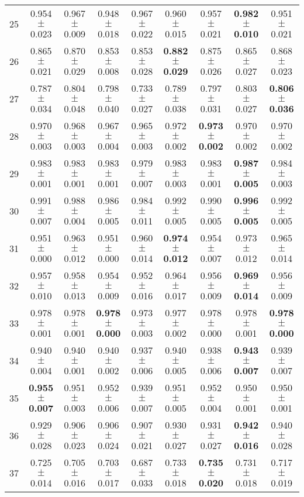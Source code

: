 \begin{table}[!ht]
{\begin{tabular}{r c c c c c c c c}
25 & 0.954 $\pm$ 0.023 & 0.967 $\pm$ 0.009 & 0.948 $\pm$ 0.018 & 0.967 $\pm$ 0.022 & 0.960 $\pm$ 0.015 & 0.957 $\pm$ 0.021 & \textbf{0.982 $\pm$ 0.010} & 0.951 $\pm$ 0.021 \\
26 & 0.865 $\pm$ 0.021 & 0.870 $\pm$ 0.029 & 0.853 $\pm$ 0.008 & 0.853 $\pm$ 0.028 & \textbf{0.882 $\pm$ 0.029} & 0.875 $\pm$ 0.026 & 0.865 $\pm$ 0.027 & 0.868 $\pm$ 0.023 \\
27 & 0.787 $\pm$ 0.034 & 0.804 $\pm$ 0.048 & 0.798 $\pm$ 0.040 & 0.733 $\pm$ 0.027 & 0.789 $\pm$ 0.038 & 0.797 $\pm$ 0.031 & 0.803 $\pm$ 0.027 & \textbf{0.806 $\pm$ 0.036} \\
28 & 0.970 $\pm$ 0.003 & 0.968 $\pm$ 0.003 & 0.967 $\pm$ 0.004 & 0.965 $\pm$ 0.003 & 0.972 $\pm$ 0.002 & \textbf{0.973 $\pm$ 0.002} & 0.970 $\pm$ 0.002 & 0.970 $\pm$ 0.002 \\
29 & 0.983 $\pm$ 0.001 & 0.983 $\pm$ 0.001 & 0.983 $\pm$ 0.001 & 0.979 $\pm$ 0.007 & 0.983 $\pm$ 0.003 & 0.983 $\pm$ 0.001 & \textbf{0.987 $\pm$ 0.005} & 0.984 $\pm$ 0.003 \\
30 & 0.991 $\pm$ 0.007 & 0.988 $\pm$ 0.004 & 0.986 $\pm$ 0.005 & 0.984 $\pm$ 0.011 & 0.992 $\pm$ 0.005 & 0.990 $\pm$ 0.005 & \textbf{0.996 $\pm$ 0.005} & 0.992 $\pm$ 0.005 \\
31 & 0.951 $\pm$ 0.000 & 0.963 $\pm$ 0.012 & 0.951 $\pm$ 0.000 & 0.960 $\pm$ 0.014 & \textbf{0.974 $\pm$ 0.012} & 0.954 $\pm$ 0.007 & 0.973 $\pm$ 0.012 & 0.965 $\pm$ 0.014 \\
32 & 0.957 $\pm$ 0.010 & 0.958 $\pm$ 0.013 & 0.954 $\pm$ 0.009 & 0.952 $\pm$ 0.016 & 0.964 $\pm$ 0.017 & 0.956 $\pm$ 0.009 & \textbf{0.969 $\pm$ 0.014} & 0.956 $\pm$ 0.009 \\
33 & 0.978 $\pm$ 0.001 & 0.978 $\pm$ 0.001 & \textbf{0.978 $\pm$ 0.000} & 0.973 $\pm$ 0.003 & 0.977 $\pm$ 0.002 & 0.978 $\pm$ 0.000 & 0.978 $\pm$ 0.001 & \textbf{0.978 $\pm$ 0.000} \\
34 & 0.940 $\pm$ 0.004 & 0.940 $\pm$ 0.001 & 0.940 $\pm$ 0.002 & 0.937 $\pm$ 0.006 & 0.940 $\pm$ 0.005 & 0.938 $\pm$ 0.006 & \textbf{0.943 $\pm$ 0.007} & 0.939 $\pm$ 0.007 \\
35 & \textbf{0.955 $\pm$ 0.007} & 0.951 $\pm$ 0.003 & 0.952 $\pm$ 0.006 & 0.939 $\pm$ 0.007 & 0.951 $\pm$ 0.005 & 0.952 $\pm$ 0.004 & 0.950 $\pm$ 0.001 & 0.950 $\pm$ 0.001 \\
36 & 0.929 $\pm$ 0.028 & 0.906 $\pm$ 0.023 & 0.906 $\pm$ 0.024 & 0.907 $\pm$ 0.021 & 0.930 $\pm$ 0.027 & 0.931 $\pm$ 0.027 & \textbf{0.942 $\pm$ 0.016} & 0.940 $\pm$ 0.028 \\
37 & 0.725 $\pm$ 0.014 & 0.705 $\pm$ 0.016 & 0.703 $\pm$ 0.017 & 0.687 $\pm$ 0.033 & 0.733 $\pm$ 0.018 & \textbf{0.735 $\pm$ 0.020} & 0.731 $\pm$ 0.018 & 0.717 $\pm$ 0.019 \\

\end{tabular}}
\end{table}
